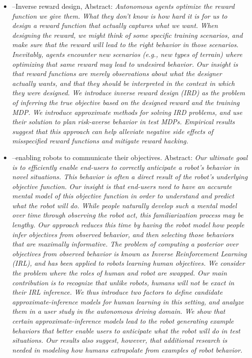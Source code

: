 {\begin{itemize}
    \item \citet{Hadfield-Menell2017-tl}--Inverse reward design, Abstract: \emph{Autonomous agents optimize the reward function we give them. What they don't know is how hard it is for us to design a reward function that actually captures what we want.   When designing the reward,  we might think of some specific training scenarios, and make sure that the reward will lead to the right behavior in those scenarios. Inevitably, agents encounter new scenarios (e.g., new types of terrain) where optimizing that same reward may lead to undesired behavior. Our insight is that reward functions are merely observations about what the designer actually wants, and that they should be interpreted in the context in which they were designed. We introduce inverse reward design (IRD) as the problem of inferring the true objective based on the designed reward and the training MDP. We introduce approximate methods for solving IRD problems, and use their solution to plan risk-averse behavior in test MDPs. Empirical results suggest that this approach can help alleviate negative side effects of misspecified reward functions and mitigate reward hacking.}
    \item \citet{Huang2017-lk}--enabling robots to communicate their objectives. Abstract: \emph{Our ultimate goal is to efficiently enable end-users to correctly anticipate a robot's behavior in novel situations. This behavior is often a direct result of the robot's underlying objective function. Our insight is that end-users need to have an accurate mental model of this objective function in order to understand and predict what the robot will do. While people naturally develop such a mental model over time through observing the robot act, this familiarization process may be lengthy. Our approach reduces this time by having the robot model how people infer objectives from observed behavior, and then selecting those behaviors that are maximally informative. The problem of computing a posterior over objectives from observed behavior is known as Inverse Reinforcement Learning (IRL), and has been applied to robots learning human objectives. We consider the problem where the roles of human and robot are swapped. Our main contribution is to recognize that unlike robots, humans will not be \emph{exact} in their IRL inference. We thus introduce two factors to define candidate approximate-inference models for human learning in this setting, and analyze them in a user study in the autonomous driving domain. We show that certain approximate-inference models lead to the robot generating example behaviors that better enable users to anticipate what the robot will do in test situations. Our results also suggest, however, that additional research is needed in modeling how humans extrapolate from examples of robot behavior.}
\end{itemize}
}
